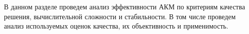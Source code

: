 В данном разделе проведем анализ эффективности АКМ
по критериям качества решения, вычислительной
сложности и
стабильности. В том числе проведем анализ используемых оценок качества, их
объективность и применимость.

%
%


